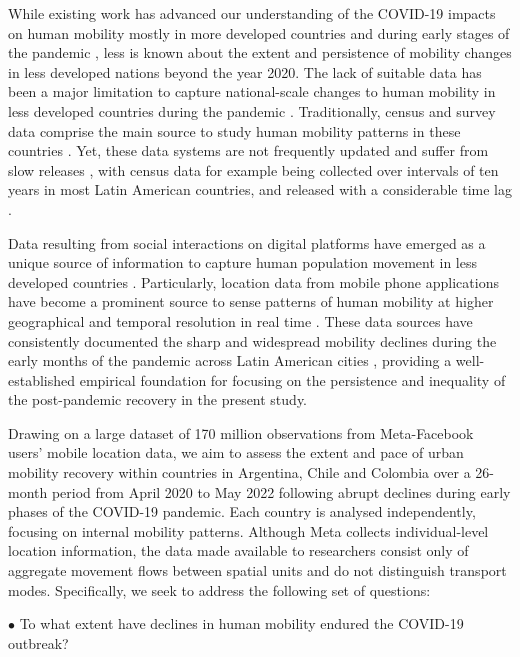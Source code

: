 \documentclass[fleqn,10pt]{wlscirep}
\begin{document}
While existing work has advanced our understanding of the COVID-19 impacts on human mobility mostly in more developed countries and during early stages of the pandemic \cite{gonzález-leonardo2022b, roweCalafiore2022, rowe2023, wang2022}, less is known about the extent and persistence of mobility changes in less developed nations beyond the year 2020. The lack of suitable data has been a major limitation to capture national-scale changes to human mobility in less developed countries during the pandemic \cite{ RoweCCA24}. Traditionally, census and survey data comprise the main source to study human mobility patterns in these countries \cite{bell2014}. Yet, these data systems are not frequently updated and suffer from slow releases \cite{rowe2023big, Cabrera-Arnau2023}, with census data for example being collected over intervals of ten years in most Latin American countries, and released with a considerable time lag \cite{bell2014}. 

Data resulting from social interactions on digital platforms have emerged as a unique source of information to capture human population movement in less developed countries \cite{rowe2023big}. Particularly, location data from mobile phone applications have become a prominent source to sense patterns of human mobility at higher geographical and temporal resolution in real time \cite{calafiore2023, iradukunda2025}. These data sources have consistently documented the sharp and widespread mobility declines during the early months of the pandemic across Latin American cities \cite{RoweCCA24, covidMexico24, elejalde2024social, demography25}, providing a well-established empirical foundation for focusing on the persistence and inequality of the post-pandemic recovery in the present study.

Drawing on a large dataset of 170 million observations from Meta-Facebook users' mobile location data, we aim to assess the extent and pace of urban mobility recovery within countries in Argentina, Chile and Colombia over a 26-month period from April 2020 to May 2022 following abrupt declines during early phases of the COVID-19 pandemic. Each country is analysed independently, focusing on internal mobility patterns. Although Meta collects individual-level location information, the data made available to researchers consist only of aggregate movement flows between spatial units and do not distinguish transport modes. Specifically, we seek to address the following set of questions:

$\bullet$ To what extent have declines in human mobility endured the COVID-19 outbreak? 
 
\end{document}

